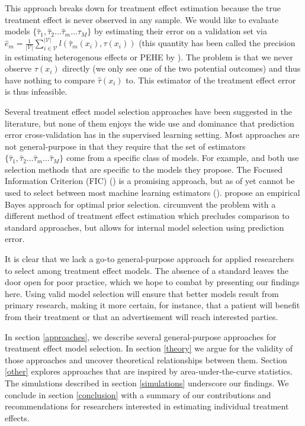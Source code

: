 This approach breaks down for treatment effect estimation because the true treatment effect is never observed in any sample. We would like to evaluate models $\{\hat\tau_1, \hat\tau_2 \dots \hat \tau_m \dots \hat \tau_M\}$ by estimating their error on a validation set via $\hat e_m = \frac{1}{|\mathcal{V}|}\sum_{i \in \mathcal{V}}^{|\mathcal{V}|}  l(\hat \tau_m (x_i), \tau(x_i))$ (this quantity has been called the precision in estimating heterogenous effects or PEHE by \citet{Hill2011}). The problem is that we never observe $\tau(x_i)$ directly (we only see one of the two potential outcomes) and thus have nothing to compare $\hat\tau(x_i)$ to. This estimator of the treatment effect error is thus infeasible.

Several treatment effect model selection approaches have been suggested in the literature, but none of them enjoys the wide use and dominance that prediction error cross-validation has in the supervised learning setting. Most approaches are not general-purpose in that they require that the set of estimators $\{\hat\tau_1, \hat\tau_2 \dots \hat \tau_m \dots \hat \tau_M\}$ come from a specific class of models. For example, \citet{Powers:2017wd} and \citet{Athey2015} both use selection methods that are specific to the models they propose. The Focused Information Criterion (FIC) (\citealp{Claeskens:2003ck}) is a promising approach, but as of yet cannot be used to select between most machine learning estimators (\citealp{Jullum:2012uo}). \citet{Alaa:tj} propose an empirical Bayes approach for optimal prior selection. \citet{Nie:2017vi} circumvent the problem with a different method of treatment effect estimation which precludes comparison to standard approaches, but allows for internal model selection using prediction error. 

It is clear that we lack a go-to general-purpose approach for applied researchers to select among treatment effect models. The absence of a standard leaves the door open for poor practice, which we hope to combat by presenting our findings here. Using valid model selection will ensure that better models result from primary research, making it more certain, for instance, that a patient will benefit from their treatment or that an advertisement will reach interested parties. 

In section \ref{approaches}, we describe several general-purpose approaches for treatment effect model selection. In section \ref{theory} we argue for the validity of those approaches and uncover theoretical relationships between them. Section \ref{other} explores approaches that are inspired by area-under-the-curve statistics. The simulations described in section \ref{simulations} underscore our findings. We conclude in section \ref{conclusion} with a summary of our contributions and recommendations for researchers interested in estimating individual treatment effects.
